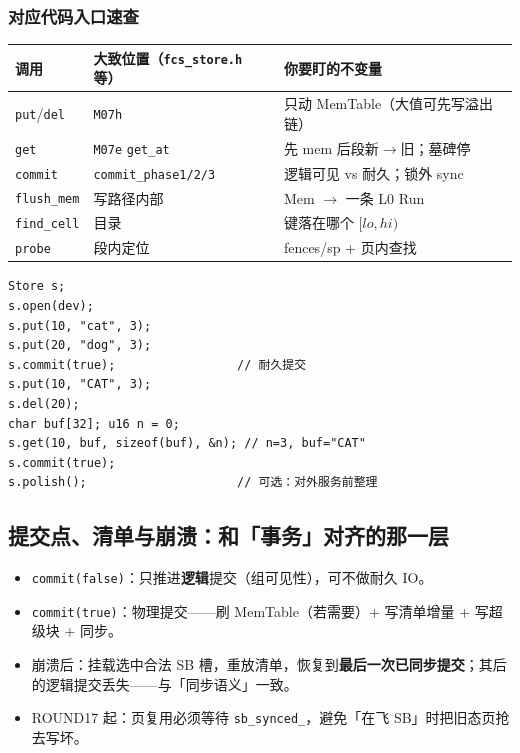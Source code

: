 \subsubsection{对应代码入口速查}
\begin{center}
\small
\begin{tabular}{@{}llp{6.8cm}@{}}
\toprule
调用 & 大致位置（\texttt{fcs\_store.h} 等） & 你要盯的不变量 \\
\midrule
\texttt{put}/\texttt{del} & \texttt{M07h} & 只动 MemTable（大值可先写溢出链） \\
\texttt{get} & \texttt{M07e} \texttt{get\_at} & 先 mem 后段新$\to$旧；墓碑停 \\
\texttt{commit} & \texttt{commit\_phase1/2/3} & 逻辑可见 vs 耐久；锁外 sync \\
\texttt{flush\_mem} & 写路径内部 & Mem $\to$ 一条 L0 Run \\
\texttt{find\_cell} & 目录 & 键落在哪个 $[lo,hi)$ \\
\texttt{probe} & 段内定位 & fences/sp + 页内查找 \\
\bottomrule
\end{tabular}
\end{center}

\begin{lstlisting}[language=fcsapi,caption={读者可粘贴的最小用法骨架}]
Store s;
s.open(dev);
s.put(10, "cat", 3);
s.put(20, "dog", 3);
s.commit(true);                 // 耐久提交
s.put(10, "CAT", 3);
s.del(20);
char buf[32]; u16 n = 0;
s.get(10, buf, sizeof(buf), &n); // n=3, buf="CAT"
s.commit(true);
s.polish();                     // 可选：对外服务前整理
\end{lstlisting}

\subsection{提交点、清单与崩溃：和「事务」对齐的那一层}
\label{sec:cd-commit}

\begin{itemize}[leftmargin=1.4em]
  \item \texttt{commit(false)}：只推进\textbf{逻辑}提交（组可见性），可不做耐久 IO。
  \item \texttt{commit(true)}：物理提交——刷 MemTable（若需要）+ 写清单增量 + 写超级块 + 同步。
  \item 崩溃后：挂载选中合法 SB 槽，重放清单，恢复到\textbf{最后一次已同步提交}；其后的逻辑提交丢失——与「同步语义」一致。
  \item ROUND17 起：页复用必须等待 \texttt{sb\_synced\_}，避免「在飞 SB」时把旧态页抢去写坏。
\end{itemize}

